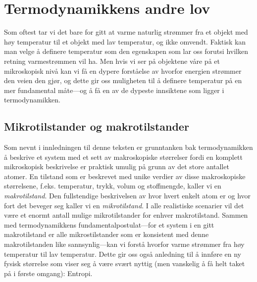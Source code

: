 \chapter{Termodynamikkens andre lov}

Som oftest tar vi det bare for gitt at varme naturlig strømmer fra et objekt med høy temperatur til et objekt med lav temperatur, og ikke omvendt. Faktisk kan man velge å definere temperatur som den egenskapen som lar oss forutsi hvilken retning varmestrømmen vil ha. Men hvis vi ser på objektene våre på et mikroskopisk nivå kan vi få en dypere forståelse av hvorfor energien strømmer den veien den gjør, og dette gir oss muligheten til å definere temperatur på en mer fundamental måte---og å få en av de dypeste innsiktene som ligger i termodynamikken.

\section{Mikrotilstander og makrotilstander}
Som nevnt i innledningen til denne teksten er grunntanken bak termodynamikken å beskrive et system med et sett av makroskopiske størrelser fordi en komplett mikroskopisk beskrivelse er praktisk umulig på grunn av det store antallet atomer. En tilstand som er beskrevet med unike verdier av disse makroskopiske størrelsene, f.eks. temperatur, trykk, volum og stoffmengde, kaller vi en \emph{makrotilstand}. Den fullstendige beskrivelsen av hvor hvert enkelt atom er og hvor fort det beveger seg kaller vi en \emph{mikrotilstand}. I alle realistiske scenarier vil det være et enormt antall mulige mikrotilstander for enhver makrotilstand. Sammen med termodynamikkens fundamentalpostulat---for et system i en gitt makrotilstand er alle mikrostilstander som er konsistent med denne makrotilstanden like sannsynlig---kan vi forstå hvorfor varme strømmer fra høy temperatur til lav temperatur. Dette gir oss også anledning til å innføre en ny fysisk størrelse som viser seg å være svært nyttig (men vanskelig å få helt taket på i første omgang): Entropi.

